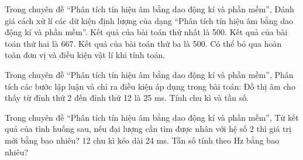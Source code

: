 \begin{ex}
Trong chuyên đề “Phân tích tín hiệu âm bằng dao động kí và phần mềm”, Đánh giá cách xử lí các dữ kiện định lượng của dạng “Phân tích tín hiệu âm bằng dao động kí và phần mềm”.
\choiceTF
{\True Kết quả của bài toán thứ nhất là 500.}
{\True Kết quả của bài toán thứ hai là 667.}
{\True Kết quả của bài toán thứ ba là 500.}
{Có thể bỏ qua hoàn toàn đơn vị và điều kiện vật lí khi tính toán.}
\end{ex}

\begin{ex}
Trong chuyên đề “Phân tích tín hiệu âm bằng dao động kí và phần mềm”, Phân tích các bước lập luận và chỉ ra điều kiện áp dụng trong bài toán: Đồ thị âm cho thấy từ đỉnh thứ 2 đến đỉnh thứ 12 là 25 ms. Tính chu kì và tần số.
\choiceTF

\end{ex}

\begin{ex}
Trong chuyên đề “Phân tích tín hiệu âm bằng dao động kí và phần mềm”, Từ kết quả của tình huống sau, nếu đại lượng cần tìm được nhân với hệ số 2 thì giá trị mới bằng bao nhiêu? 12 chu kì kéo dài 24 ms. Tần số tính theo Hz bằng bao nhiêu?
\end{ex}

